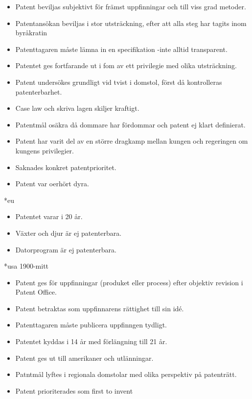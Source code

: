 \begin{itemize}
	\item Patent beviljas subjektivt för främst uppfinningar och till viss grad metoder.
	\item Patentansökan beviljas i stor utsträckning, efter att alla steg har tagits inom byråkratin
	\item Patenttagaren måste lämna in en specifikation -inte alltid transparent.
	\item Patentet ges fortfarande ut i fom av ett privilegie med olika utsträckning.
	\item Patent undersökes grundligt vid tvist i domstol, först då kontrolleras patenterbarhet.
	\item Case law och skriva lagen skiljer kraftigt.
	\item Patentmål osäkra då dommare har fördommar och patent ej klart definierat.
	\item Patent har varit del av en större dragkamp mellan kungen och regeringen om kungens privilegier. 
	\item Saknades konkret patentprioritet.
	\item Patent var oerhört dyra.
\end{itemize}

*eu



\begin{itemize}
	\item Patentet varar i 20 år.
	\item Växter och djur är ej patenterbara.
	\item Datorprogram är ej patenterbara.
\end{itemize}	


*usa 1900-mitt

\begin{itemize}
	\item Patent ges för uppfinningar (produket eller process) efter objektiv revision i Patent Office.
	\item Patent betraktas som uppfinnarens rättighet till sin idé.
	\item Patenttagaren måste publicera uppfinngen tydligt.
	\item Patentet kyddas i 14 år med förlängning till 21 år.
	\item Patent ges ut till amerikaner och utlänningar.
	\item Patntmål lyftes i regionala domstolar med olika perspektiv på patenträtt.
	\item Patent prioriterades som first to invent
\end{itemize}



